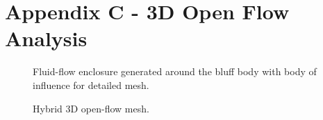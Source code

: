\newpage
\section*{Appendix C - 3D Open Flow Analysis} 

\begin{figure}[!htb]
    \centering
    \noindent{}
    \caption{Fluid-flow enclosure generated around the bluff body with body of influence for detailed mesh.}
    \label{fig:3D_OF_FLOWFIELD}
\end{figure}

\begin{figure}[!htb]
    \centering
    \noindent{}
    \caption{Hybrid 3D open-flow mesh.}
    \label{fig:3D_OF_MESH}
\end{figure}

